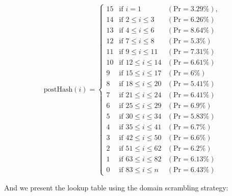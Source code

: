 {
\renewcommand{\arraystretch}{1.25}
\[
\text{postHash}(i) = \left\{
\begin{array}{lll}
    \text{15} & \text{if } i = 1 & (\text{Pr} = 3.29\%), \\
    \text{14} & \text{if } 2 \leq i \leq 3 & (\text{Pr} = 6.26\%) \\
    \text{13} & \text{if } 4 \leq i \leq 6 & (\text{Pr} = 8.64\%) \\
    \text{12} & \text{if } 7 \leq i \leq 8 & (\text{Pr} = 5.3\%) 
    \\
    \text{11} & \text{if } 9 \leq i \leq 11 & (\text{Pr} = 7.31\%) \\
    \text{10} & \text{if } 12 \leq i \leq 14 & (\text{Pr} = 6.61\%) \\
    \text{9} & \text{if } 15 \leq i \leq 17 & (\text{Pr} = 6\%) \\
    \text{8} & \text{if } 18 \leq i \leq 20 & (\text{Pr} = 5.41\%) \\
    \text{7} & \text{if } 21 \leq i \leq 24 & (\text{Pr} = 6.41\%) \\
    \text{6} & \text{if } 25 \leq i \leq 29 & (\text{Pr} = 6.9\%) \\
    \text{5} & \text{if } 30 \leq i \leq 34 & (\text{Pr} = 5.83\%) \\
    \text{4} & \text{if } 35 \leq i \leq 41 & (\text{Pr} = 6.7\%) \\
    \text{3} & \text{if } 42 \leq i \leq 50 & (\text{Pr} = 6.6\%) \\
    \text{2} & \text{if } 51 \leq i \leq 62 & (\text{Pr} = 6.2\%) \\
    \text{1} & \text{if } 63 \leq i \leq 82 & (\text{Pr} = 6.13\%) \\
    \text{0} & \text{if } 83 \leq i \leq n & (\text{Pr} = 6.43\%)
\end{array}
\right.
\]
}

And we present the lookup table using the domain scrambling strategy: 



